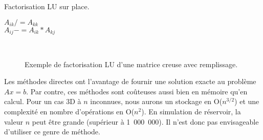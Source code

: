 \begin{algorithm}
  \caption{Factorisation LU sur place.}
  \label{algo:lu}
   {
     {
      $A_{ik} /= A_{kk}$ \\
       {
        $A_{ij} -= A_{ik}*A_{kj}$
      }
    }
  }
\end{algorithm}

\begin{figure}[!h]
     \begin{center}
        ~
    \end{center}
    \caption{Exemple de factorisation LU d'une matrice creuse avec remplissage.}
    \label{fig:lu_example}
\end{figure}

Les méthodes directes ont l'avantage de fournir une solution exacte au problème $Ax=b$.
%
Par contre, ces méthodes sont coûteuses aussi bien en mémoire qu'en calcul.
%
Pour un cas 3D à $n$ inconnues, nous aurons un stockage en O($n^{3/2}$) et une complexité en nombre d'opérations en O($n^2$).
%
En simulation de réservoir, la valeur $n$ peut être grande (supérieur à 1~000~000).
%
Il n'est donc pas envisageable d'utiliser ce genre de méthode.
